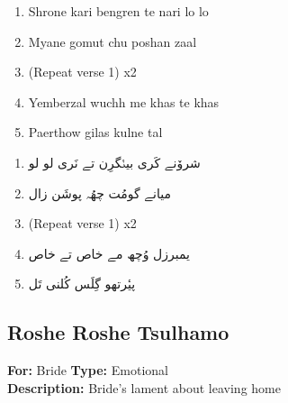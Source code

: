 \documentclass[12pt]{article}
\newcommand{\bigroman}[1]{\fontsize{16pt}{18pt}\selectfont\RaggedRight #1}
\newcommand{\bigarabic}[1]{\fontsize{16pt}{18pt}\selectfont \textarabic{#1}}
\begin{document}
    \begin{multicols}{2}
      \begin{enumerate}[leftmargin=*, label=\arabic*., font=\fontsize{16pt}{18pt}\selectfont]
        \item \bigroman{Shrone kari bengren te nari lo lo}
        \item \bigroman{Myane gomut chu poshan zaal}
        \item \bigroman{(Repeat verse 1) x2}
        \item \bigroman{Yemberzal wuchh me khas te khas}
        \item \bigroman{Paerthow gilas kulne tal}
      \end{enumerate}
      
      \columnbreak
      
      \begin{RTL}
      \begin{enumerate}[leftmargin=*, label=\arabic*., font=\fontsize{16pt}{18pt}\selectfont]
        \item \bigarabic{شرۆنے کَری بینٛگرِن تے نَری لو لو}
        \item \bigarabic{میانے گومُت چھُہ پوشَن زال}
        \item \bigarabic{(Repeat verse 1) x2}
        \item \bigarabic{یمبرزل وُچھ مے خاص تے خاص}
        \item \bigarabic{پیٔرتھو گِلَس کُلنی تَل}
      \end{enumerate}
      \end{RTL}
      \end{multicols}




      \subsection*{Roshe Roshe Tsulhamo}
      \textbf{For:} Bride \quad \textbf{Type:} Emotional\\
      \textbf{Description:} Bride's lament about leaving home
      
\end{document}
